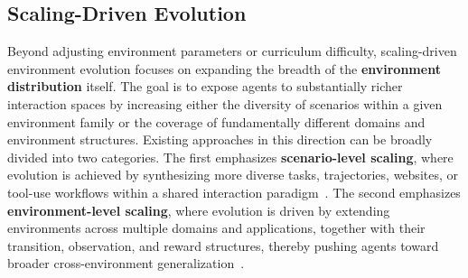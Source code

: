 \documentclass{llmxive}
\begin{document}
\subsection{Scaling-Driven Evolution}\label{sec:scaling_evo}
Beyond adjusting environment parameters or curriculum difficulty, scaling-driven environment evolution focuses on expanding the breadth of the \textbf{environment distribution} itself.
The goal is to expose agents to substantially richer interaction spaces by increasing either the diversity of scenarios within a given environment family or the coverage of fundamentally different domains and environment structures.
Existing approaches in this direction can be broadly divided into two categories.
The first emphasizes \textbf{scenario-level scaling}, where evolution is achieved by synthesizing more diverse tasks, trajectories, websites, or tool-use workflows within a shared interaction paradigm~\cite{EnvScaler,AutoForge,AgentScaler,InfiniteWeb,AutoWebWorld}.
The second emphasizes \textbf{environment-level scaling}, where evolution is driven by extending environments across multiple domains and applications, together with their transition, observation, and reward structures, thereby pushing agents toward broader cross-environment generalization~\cite{ARE,AutoEnv}.
\end{document}

